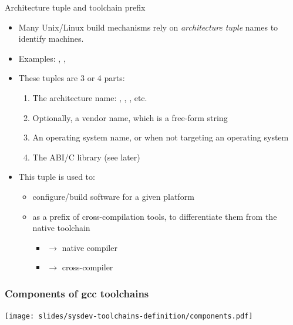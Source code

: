\begin{frame}{Architecture tuple and toolchain prefix}
  \begin{itemize}
  \item Many Unix/Linux build mechanisms rely on {\em architecture
      tuple} names to identify machines.
  \item Examples: ,
    , 
  \item These tuples are 3 or 4 parts:
    \begin{enumerate}
    \item The architecture name: , ,
      , etc.
    \item Optionally, a vendor name, which is a free-form string
    \item An operating system name, or  when not targeting
      an operating system
    \item The ABI/C library (see later)
    \end{enumerate}
  \item This tuple is used to:
    \begin{itemize}
    \item configure/build software for a given platform
    \item as a prefix of cross-compilation tools, to differentiate
      them from the native toolchain
      \begin{itemize}
      \item {} $\rightarrow$ native compiler
      \item {} $\rightarrow$ cross-compiler
      \end{itemize}
    \end{itemize}
  \end{itemize}
\end{frame}

\begin{frame}
  \frametitle{Components of gcc toolchains}
  \begin{center}
    \texttt{[image: slides/sysdev-toolchains-definition/components.pdf]}
  \end{center}
\end{frame}

